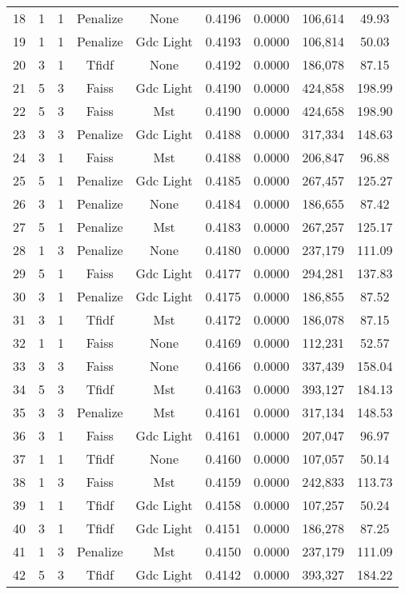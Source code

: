 \begin{longtable}{@{}ccccccccc@{}}
18 & 1 & 1 & Penalize & None & 0.4196 & 0.0000 & 106,614 & 49.93 \\
19 & 1 & 1 & Penalize & Gdc Light & 0.4193 & 0.0000 & 106,814 & 50.03 \\
20 & 3 & 1 & Tfidf & None & 0.4192 & 0.0000 & 186,078 & 87.15 \\
21 & 5 & 3 & Faiss & Gdc Light & 0.4190 & 0.0000 & 424,858 & 198.99 \\
22 & 5 & 3 & Faiss & Mst & 0.4190 & 0.0000 & 424,658 & 198.90 \\
23 & 3 & 3 & Penalize & Gdc Light & 0.4188 & 0.0000 & 317,334 & 148.63 \\
24 & 3 & 1 & Faiss & Mst & 0.4188 & 0.0000 & 206,847 & 96.88 \\
25 & 5 & 1 & Penalize & Gdc Light & 0.4185 & 0.0000 & 267,457 & 125.27 \\
26 & 3 & 1 & Penalize & None & 0.4184 & 0.0000 & 186,655 & 87.42 \\
27 & 5 & 1 & Penalize & Mst & 0.4183 & 0.0000 & 267,257 & 125.17 \\
28 & 1 & 3 & Penalize & None & 0.4180 & 0.0000 & 237,179 & 111.09 \\
29 & 5 & 1 & Faiss & Gdc Light & 0.4177 & 0.0000 & 294,281 & 137.83 \\
30 & 3 & 1 & Penalize & Gdc Light & 0.4175 & 0.0000 & 186,855 & 87.52 \\
31 & 3 & 1 & Tfidf & Mst & 0.4172 & 0.0000 & 186,078 & 87.15 \\
32 & 1 & 1 & Faiss & None & 0.4169 & 0.0000 & 112,231 & 52.57 \\
33 & 3 & 3 & Faiss & None & 0.4166 & 0.0000 & 337,439 & 158.04 \\
34 & 5 & 3 & Tfidf & Mst & 0.4163 & 0.0000 & 393,127 & 184.13 \\
35 & 3 & 3 & Penalize & Mst & 0.4161 & 0.0000 & 317,134 & 148.53 \\
36 & 3 & 1 & Faiss & Gdc Light & 0.4161 & 0.0000 & 207,047 & 96.97 \\
37 & 1 & 1 & Tfidf & None & 0.4160 & 0.0000 & 107,057 & 50.14 \\
38 & 1 & 3 & Faiss & Mst & 0.4159 & 0.0000 & 242,833 & 113.73 \\
39 & 1 & 1 & Tfidf & Gdc Light & 0.4158 & 0.0000 & 107,257 & 50.24 \\
40 & 3 & 1 & Tfidf & Gdc Light & 0.4151 & 0.0000 & 186,278 & 87.25 \\
41 & 1 & 3 & Penalize & Mst & 0.4150 & 0.0000 & 237,179 & 111.09 \\
42 & 5 & 3 & Tfidf & Gdc Light & 0.4142 & 0.0000 & 393,327 & 184.22 \\

\end{longtable}
